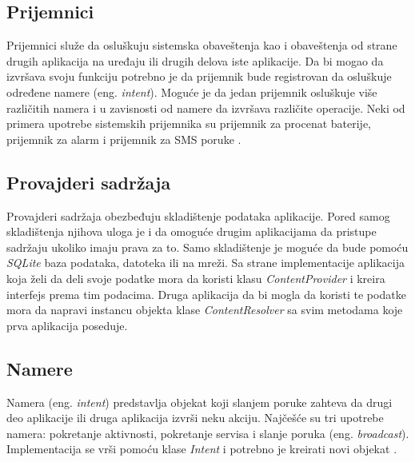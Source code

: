 \documentclass[android.tex]{subfiles}
\begin{document}
\subsection{Prijemnici}
Prijemnici služe da osluškuju sistemska obaveštenja kao i obaveštenja od strane drugih aplikacija na uređaju ili drugih delova iste aplikacije. Da bi mogao da izvršava svoju funkciju potrebno je da prijemnik bude registrovan da osluškuje određene namere (eng. \textit{intent}). Moguće je da jedan prijemnik osluškuje više različitih namera i u zavisnosti od namere da izvršava različite operacije. Neki od primera upotrebe sistemskih prijemnika su prijemnik za procenat baterije, prijemnik za alarm i prijemnik za SMS poruke \cite{book:mzivkovic}. 

\subsection{Provajderi sadržaja}
Provajderi sadržaja obezbeđuju skladištenje podataka aplikacije. Pored samog skladištenja njihova uloga je i da omoguće drugim aplikacijama da pristupe sadržaju ukoliko imaju prava za to. Samo skladištenje je moguće da bude pomoću \textit{SQLite} baza podataka, datoteka ili na mreži. Sa strane implementacije aplikacija koja želi da deli svoje podatke mora da koristi klasu \textit{ContentProvider} i kreira interfejs prema tim podacima. Druga aplikacija da bi mogla da  koristi te podatke mora da napravi instancu objekta klase \textit{ContentResolver} sa svim metodama koje prva aplikacija poseduje. 

\subsection{Namere}
\label{sec:namere}
Namera (eng. \textit{intent}) predstavlja objekat koji slanjem poruke zahteva da drugi deo aplikacije ili druga aplikacija izvrši neku akciju. Najčešće su tri upotrebe namera: pokretanje aktivnosti, pokretanje servisa i slanje poruka (eng. \textit{broadcast}). Implementacija se vrši pomoću klase \textit{Intent} i potrebno je kreirati novi objekat \cite{sajt:androidDevelopers}. 
\end{document}
